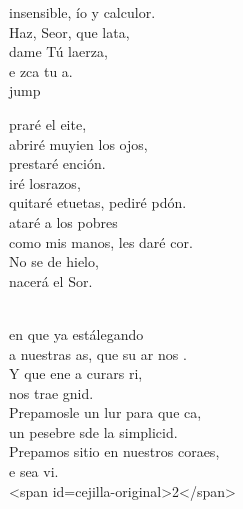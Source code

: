 \begin{cancion}
	insensible, ío y calculor.\\
	Haz, Seor, que lata, \\
	dame Tú laerza,\\
	e zca tu a.\\jump\\
	\begin{chorus}%
	praré el eite, \\
	abriré muyien los ojos, \\
	prestaré ención.\\
	iré losrazos, \\
	quitaré etuetas, pediré pdón.\\
	ataré a los pobres \\
	como mis manos, les daré cor.\\
	No se de hielo,  \\
	nacerá el Sor.\\
	\end{chorus}%
	\jump\\
	en que ya estálegando  \\
	a nuestras as, que su ar nos .\\
	Y que ene a curars  ri, \\
	nos trae gnid.\\
	Prepamosle un lur para que ca,  \\
	un pesebre sde la simplicid.\\
	Prepamos sitio en nuestros coraes,\\
	e sea vi.\\
<span id=cejilla-original>2</span>\\
\end{cancion}%
